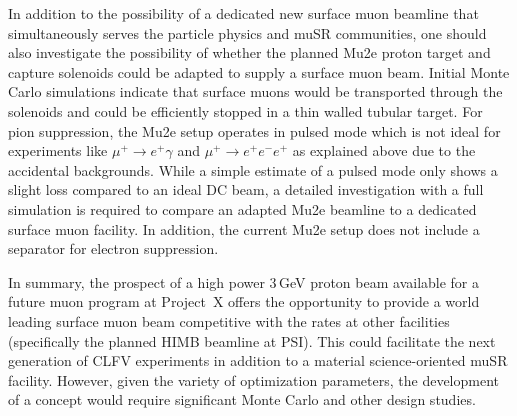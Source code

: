 In addition to the possibility of a dedicated new surface muon beamline that simultaneously serves the particle physics and muSR communities, one should also investigate the possibility of whether the planned Mu2e proton target and capture solenoids could be adapted to supply a surface muon beam.
Initial Monte Carlo simulations indicate that surface muons would be transported through the solenoids and could be efficiently stopped in a thin walled tubular target. For pion suppression, the Mu2e setup operates in pulsed mode which is not ideal for experiments like $\mu^+ \to e^+\gamma$ and $\mu^+ \to e^+e^-e^+$ as explained above due to the accidental backgrounds. While a simple estimate of a pulsed mode only shows a slight loss compared to an ideal DC beam, a detailed investigation with a full simulation is required to compare an adapted Mu2e beamline to a dedicated surface muon facility. In addition, the current Mu2e setup does not include a separator for electron suppression.

In summary, the prospect of a high power 3\,GeV proton beam available for a future muon program at Project~X offers the opportunity to provide a world leading surface muon beam competitive with the rates at other facilities (specifically the planned HIMB beamline at PSI). This could facilitate the next generation of CLFV experiments in addition to a material science-oriented muSR facility. However, given the variety of optimization parameters, the development of a concept would require significant Monte Carlo and other design studies.

%
